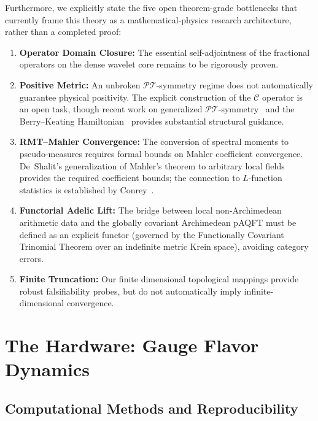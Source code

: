 Furthermore, we explicitly state the five open theorem-grade bottlenecks that currently frame this theory as a mathematical-physics research architecture, rather than a completed proof:
\begin{enumerate}
    \item \textbf{Operator Domain Closure:} The essential self-adjointness of the fractional operators on the dense wavelet core remains to be rigorously proven.
    \item \textbf{Positive Metric:} An unbroken $\mathcal{PT}$-symmetry regime does not automatically guarantee physical positivity. The explicit construction of the $\mathcal{C}$ operator is an open task, though recent work on generalized $\mathcal{PT}$-symmetry~\cite{BenderBerryMandilara2002} and the Berry--Keating Hamiltonian~\cite{BenderBrodyMuller2017} provides substantial structural guidance.
    \item \textbf{RMT--Mahler Convergence:} The conversion of spectral moments to pseudo-measures requires formal bounds on Mahler coefficient convergence. De~Shalit's generalization of Mahler's theorem to arbitrary local fields~\cite{deShalit2016} provides the required coefficient bounds; the connection to $L$-function statistics is established by Conrey~\cite{Conrey_RMT}.
    \item \textbf{Functorial Adelic Lift:} The bridge between local non-Archimedean arithmetic data and the globally covariant Archimedean pAQFT must be defined as an explicit functor (governed by the Functionally Covariant Trinomial Theorem over an indefinite metric Krein space), avoiding category errors.
    \item \textbf{Finite Truncation:} Our finite dimensional topological mappings provide robust falsifiability probes, but do not automatically imply infinite-dimensional convergence.
\end{enumerate}

\section{The Hardware: Gauge Flavor Dynamics}


\subsection{Computational Methods and Reproducibility}

